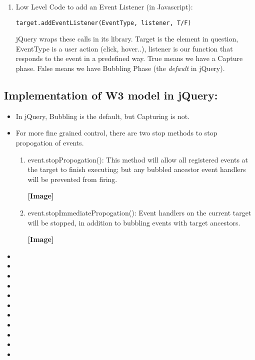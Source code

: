 \documentclass[8pt,a4paper]{extarticle}
\begin{document}
\begin{itemize}
\begin{enumerate}
\item Low Level Code to add an Event Listener (in Javascript):

\begin{verbatim}
target.addEventListener(EventType, listener, T/F)
\end{verbatim}

jQuery wraps these calls in its library. Target is the element in question, EventType is a user action (click, hover..), listener is our function that responds to the event in a predefined way. True means we have a Capture phase. False means we have Bubbling Phase (the \textit{default} in jQuery).

\end{enumerate}
\end{itemize}

\subsection*{Implementation of W3 model in jQuery:}
\begin{itemize}
\item In jQuery, Bubbling is the default, but Capturing is not.
\item For more fine grained control, there are two stop methods to stop propogation of events.
\begin{enumerate}
\item event.stopPropogation(): This method will allow all registered events at the target to finish executing; but any bubbled ancestor event handlers will be prevented from firing.

\textbf{[Image]}

\item event.stopImmediatePropogation(): Event handlers on the current target will be stopped, in addition to bubbling events with target ancestors.

\textbf{[Image]}

\end{enumerate}
\item
\item
\item
\item
\item
\item
\item
\item
\item
\item
\item
\end{itemize}
\end{document}
